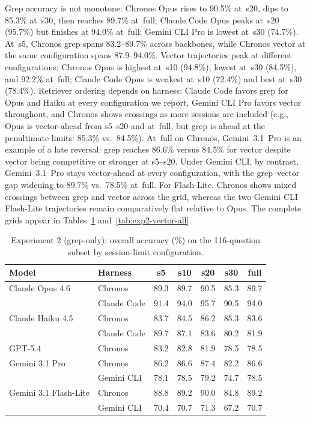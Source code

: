 \documentclass[sigconf,nonacm]{acmart}
\begin{document}
Grep accuracy is not monotone: Chronos Opus rises to 90.5\% at~s20, dips to 85.3\% at~s30, then reaches 89.7\% at~full; Claude Code Opus peaks at~s20 (95.7\%) but finishes at 94.0\% at~full; Gemini CLI Pro is lowest at~s30 (74.7\%).
At~s5, Chronos grep spans 83.2--89.7\% across backbones, while Chronos vector at the same configuration spans 87.9--94.0\%.
Vector trajectories peak at different configurations: Chronos Opus is highest at~s10 (94.8\%), lowest at~s30 (84.5\%), and 92.2\% at~full; Claude Code Opus is weakest at~s10 (72.4\%) and best at~s30 (78.4\%).
Retriever ordering depends on harness: Claude Code favors grep for Opus and Haiku at every configuration we report, Gemini CLI Pro favors vector throughout, and Chronos shows crossings as more sessions are included (e.g., Opus is vector-ahead from s5--s20 and at~full, but grep is ahead at the penultimate limits: 85.3\% vs.\ 84.5\%).
At~full on Chronos, Gemini~3.1~Pro is an example of a late reversal: grep reaches 86.6\% versus 84.5\% for vector despite vector being competitive or stronger at s5--s20. Under Gemini CLI, by contrast, Gemini~3.1~Pro stays vector-ahead at every configuration, with the grep--vector gap widening to 89.7\% vs.\ 78.5\% at~full.
For Flash-Lite, Chronos shows mixed crossings between grep and vector across the grid, whereas the two Gemini CLI Flash-Lite trajectories remain comparatively flat relative to Opus.
The complete grids appear in Tables~\ref{tab:exp2-grep-all} and~\ref{tab:exp2-vector-all}.

\begin{table}[t]
    \caption{Experiment 2 (grep-only): overall accuracy (\%) on the 116-question subset by session-limit configuration.}
    \label{tab:exp2-grep-all}
    \centering
    \small
    \begin{tabular}{@{}llccccc@{}}
      \toprule
      Model & Harness & s5 & s10 & s20 & s30 & full \\
      \midrule
      Claude Opus 4.6       & Chronos      & 89.3 & 89.7 & 90.5 & 85.3 & 89.7 \\
                            & Claude Code  & 91.4 & 94.0 & 95.7 & 90.5 & 94.0 \\
      \midrule
      Claude Haiku 4.5      & Chronos      & 83.7 & 84.5 & 86.2 & 85.3 & 83.6 \\
                            & Claude Code  & 89.7 & 87.1 & 83.6 & 80.2 & 81.9 \\
      \midrule
      GPT-5.4               & Chronos      & 83.2 & 82.8 & 81.9 & 78.5 & 78.5 \\
      \midrule
      Gemini 3.1 Pro        & Chronos      & 86.2 & 86.6 & 87.4 & 82.2 & 86.6 \\
                            & Gemini CLI   & 78.1 & 78.5 & 79.2 & 74.7 & 78.5 \\
      \midrule
      Gemini 3.1 Flash-Lite & Chronos      & 88.8 & 89.2 & 90.0 & 84.8 & 89.2 \\
                            & Gemini CLI   & 70.4 & 70.7 & 71.3 & 67.2 & 70.7 \\
      \bottomrule
    \end{tabular}
\end{table}
\end{document}
